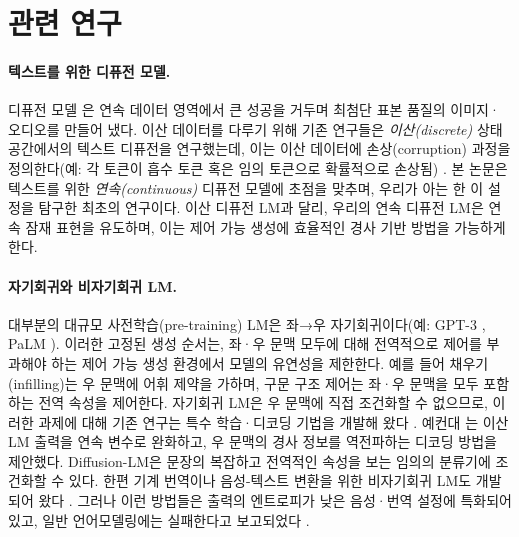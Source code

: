 \documentclass{article}
\begin{document}
\section{관련 연구}
\label{sec:related_work}


\paragraph{텍스트를 위한 디퓨전 모델.}
디퓨전 모델 \cite{pmlr-v37-sohl-dickstein15}은 연속 데이터 영역에서 큰 성공을 거두며 \cite{ho2020denoising,nichol2021improved, kong2020diffwave, Mittal2021Music} 최첨단 표본 품질의 이미지·오디오를 만들어 냈다. 이산 데이터를 다루기 위해 기존 연구들은 \emph{이산(discrete)} 상태 공간에서의 텍스트 디퓨전을 연구했는데, 이는 이산 데이터에 손상(corruption) 과정을 정의한다(예: 각 토큰이 흡수 토큰 혹은 임의 토큰으로 확률적으로 손상됨) \cite{austin2021structured,hoogeboom2021argmax,hoogeboom2022autoregressive}.
본 논문은 텍스트를 위한 \emph{연속(continuous)} 디퓨전 모델에 초점을 맞추며, 우리가 아는 한 이 설정을 탐구한 최초의 연구이다.
이산 디퓨전 LM과 달리, 우리의 연속 디퓨전 LM은 연속 잠재 표현을 유도하며, 이는 제어 가능 생성에 효율적인 경사 기반 방법을 가능하게 한다.

\paragraph{자기회귀와 비자기회귀 LM.}
대부분의 대규모 사전학습(pre-training) LM은 좌→우 자기회귀이다(예: GPT-3 \cite{brown-et-al-gpt3}, PaLM \cite{Chowdhery2022PaLMSL}). 이러한 고정된 생성 순서는, 좌·우 문맥 모두에 대해 전역적으로 제어를 부과해야 하는 제어 가능 생성 환경에서 모델의 유연성을 제한한다. 예를 들어 채우기(infilling)는 우 문맥에 어휘 제약을 가하며, 구문 구조 제어는 좌·우 문맥을 모두 포함하는 전역 속성을 제어한다.
자기회귀 LM은 우 문맥에 직접 조건화할 수 없으므로, 이러한 과제에 대해 기존 연구는 특수 학습·디코딩 기법을 개발해 왔다 \cite{sha-2020-gradient,donahue-etal-2020-enabling,qin-etal-2020-back}.
예컨대 \citet{Qin-COLD}는 이산 LM 출력을 연속 변수로 완화하고, 우 문맥의 경사 정보를 역전파하는 디코딩 방법을 제안했다.
Diffusion-LM은 문장의 복잡하고 전역적인 속성을 보는 임의의 분류기에 조건화할 수 있다.
한편 기계 번역이나 음성-텍스트 변환을 위한 비자기회귀 LM도 개발되어 왔다 \cite{gu2018nonautoregressive,saharia2020latentalignments}.
그러나 이런 방법들은 출력의 엔트로피가 낮은 음성·번역 설정에 특화되어 있고, 일반 언어모델링에는 실패한다고 보고되었다 \cite{ren-etal-2020-study}.
\end{document}
